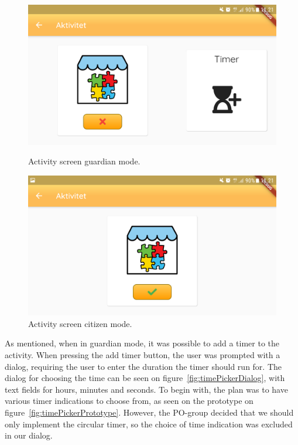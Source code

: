 \begin{figure}[H]
  \includegraphics[width=\linewidth]{sections/4Sprint/images/addTimerGuardian.png}
  \caption{Activity screen guardian mode.}
  \label{fig:addTimerGuardian}
\endminipage\hfill \quad
{}
  \includegraphics[width=\linewidth]{sections/4Sprint/images/addTimerCitizen.png}
  \caption{Activity screen citizen mode.}
  \label{fig:addTimerCitizen}
\endminipage\hfill
\end{figure}

As mentioned, when in guardian mode, it was possible to add a timer to the activity. When pressing the add timer button, the user was prompted with a dialog, requiring the user to enter the duration the timer should run for. The dialog for choosing the time can be seen on figure~\ref{fig:timePickerDialog}, with text fields for hours, minutes and seconds. To begin with, the plan was to have various timer indications to choose from, as seen on the prototype on figure~\ref{fig:timePickerPrototype}. However, the PO-group decided that we should only implement the circular timer, so the choice of time indication was excluded in our dialog.

